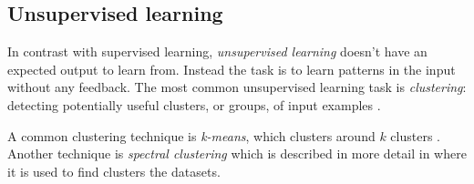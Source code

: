 
\subsection{Unsupervised learning}

In contrast with supervised learning, \textit{unsupervised learning} doesn't have an expected output to learn from. Instead the task is to learn patterns in the input without any feedback.  The most common unsupervised learning task is \textit{clustering}: detecting potentially useful clusters, or groups, of input examples \citep{norvigAI}.

A common clustering technique is \textit{k-means}, which clusters around $k$ clusters \citep{jain1999data}. Another technique is \textit{spectral clustering} which is described in more detail in  where it is used to find clusters the datasets.

